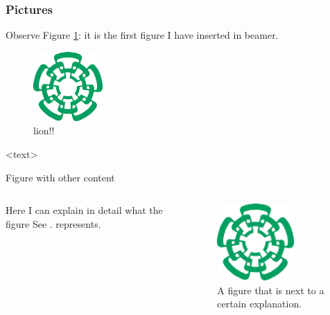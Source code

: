 \documentclass[
	11pt, %
]{beamer}
\begin{document}
\begin{frame}
  \frametitle{Pictures}
  Observe Figure \ref{fig:question}: it is the
first figure I have inserted in beamer.
\begin{figure}
  \centering
  \includegraphics[scale=0.5]{cinvestavlogo}
  \caption{lion!!}
  \label{fig:question}
\end{figure}
<text>
\end{frame}

\begin{frame}{Figure with other content}
\begin{columns}
\begin{column}{0.5\textwidth}
        Here I can explain in detail what the figure See \citet{james}. represents.
\end{column}
\begin{column}{0.5\textwidth}
    \begin{figure}
    \centering
        \includegraphics[width=0.7\textwidth]{cinvestavlogo}
        \caption{A figure that is next to a certain explanation.}
    \end{figure}
\end{column}
\end{columns}
\end{frame}
\end{document}
